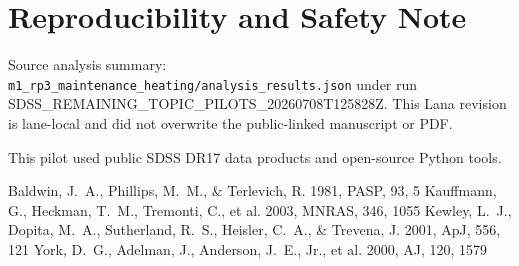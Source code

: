 \documentclass[twocolumn]{aastex631}
\begin{document}
\section*{Reproducibility and Safety Note}
Source analysis summary: \texttt{m1\_rp3\_maintenance\_heating/analysis\_results.json} under run SDSS\_REMAINING\_TOPIC\_PILOTS\_20260708T125828Z.  This Lana revision is lane-local and did not overwrite the public-linked manuscript or PDF.

\acknowledgments
This pilot used public SDSS DR17 data products and open-source Python tools.

\begin{thebibliography}{}
 Baldwin, J.~A., Phillips, M.~M., \& Terlevich, R. 1981, PASP, 93, 5
 Kauffmann, G., Heckman, T.~M., Tremonti, C., et al. 2003, MNRAS, 346, 1055
 Kewley, L.~J., Dopita, M.~A., Sutherland, R.~S., Heisler, C.~A., \& Trevena, J. 2001, ApJ, 556, 121
 York, D.~G., Adelman, J., Anderson, J.~E., Jr., et al. 2000, AJ, 120, 1579
\end{thebibliography}
\end{document}
